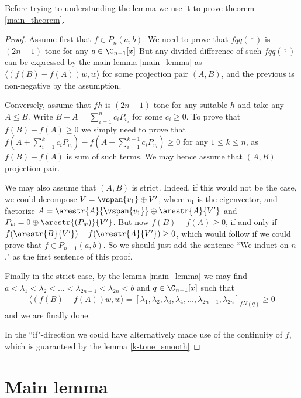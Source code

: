 Before trying to understanding the lemma we use it to prove theorem \ref{main_theorem}.

\begin{proof}
	Assume first that $f \in P_{n}(a, b)$. We need to prove that $f q \overline{q(\overline{\cdot})}$ is $(2 n - 1)$-tone for any $q \in \C_{n - 1}[x]$ But any divided difference of such $f q \overline{q(\overline{\cdot})}$ can be expressed by the main lemma \ref{main_lemma} as $\langle (f(B) - f(A)) w, w \rangle$ for some projection pair $(A, B)$, and the previous is non-negative by the assumption.

	Conversely, assume that $f h$ is $(2 n - 1)$-tone for any suitable $h$ and take any $A \leq B$. Write $B - A = \sum_{i = 1}^{n} c_{i} P_{v_{i}}$ for some $c_{i} \geq 0$. To prove that $f(B) - f(A) \geq 0$ we simply need to prove that $f(A + \sum_{i = 1}^{k} c_{i} P_{v_{i}}) - f(A + \sum_{i = 1}^{k - 1} c_{i} P_{v_{i}}) \geq 0$ for any $1 \leq k \leq n$, as $f(B) - f(A)$ is sum of such terms. We may hence assume that $(A, B)$ projection pair.

	We may also assume that $(A, B)$ is strict. Indeed, if this would not be the case, we could decompose $V = \vspan\{v_{1}\} \oplus V'$, where $v_{1}$ is the eigenvector, and factorize $A = \arestr{A}{\vspan\{v_{1}\}} \oplus \arestr{A}{V'}$ and $P_{w} = 0 \oplus \arestr{(P_{w})}{V'}$. But now $f(B) - f(A) \geq 0$, if and only if$f(\arestr{B}{V'}) - f(\arestr{A}{V'}) \geq 0$, which would follow if we could prove that $f \in P_{n - 1}(a, b)$. So we should just add the sentence ``We induct on $n$." as the first sentence of this proof.

	Finally in the strict case, by the lemma \ref{main_lemma} we may find $a < \lambda_{1} < \lambda_{2} < \ldots < \lambda_{2 n - 1} < \lambda_{2 n} < b$ and $q \in \C_{n - 1}[x]$ such that
	\begin{align*}
		\langle (f(B) - f(A)) w, w \rangle = [\lambda_{1}, \lambda_{2}, \lambda_{3}, \lambda_{4}, \ldots, \lambda_{2n - 1}, \lambda_{2 n}]_{f N(q)} \geq 0
	\end{align*}
	and we are finally done.

	In the ``if"-direction we could have alternatively made use of the continuity of $f$, which is guaranteed by the lemma \ref{k-tone_smooth}

\end{proof}

\section{Main lemma}

